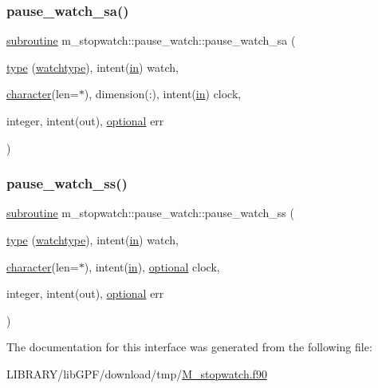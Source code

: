\subsubsection{\texorpdfstring{pause\+\_\+watch\+\_\+sa()}{pause\_watch\_sa()}}
{\footnotesize\ttfamily \hyperlink{M__stopwatch_83_8txt_acfbcff50169d691ff02d4a123ed70482}{subroutine} m\+\_\+stopwatch\+::pause\+\_\+watch\+::pause\+\_\+watch\+\_\+sa (\begin{DoxyParamCaption}\item[{\hyperlink{stop__watch_83_8txt_a70f0ead91c32e25323c03265aa302c1c}{type} (\hyperlink{structm__stopwatch_1_1watchtype}{watchtype}), intent(\hyperlink{M__journal_83_8txt_afce72651d1eed785a2132bee863b2f38}{in})}]{watch,  }\item[{\hyperlink{option__stopwatch_83_8txt_abd4b21fbbd175834027b5224bfe97e66}{character}(len=$\ast$), dimension(\+:), intent(\hyperlink{M__journal_83_8txt_afce72651d1eed785a2132bee863b2f38}{in})}]{clock,  }\item[{integer, intent(out), \hyperlink{option__stopwatch_83_8txt_aa4ece75e7acf58a4843f70fe18c3ade5}{optional}}]{err }\end{DoxyParamCaption})\hspace{0.3cm}{\ttfamily [private]}}

\mbox{\label{interfacem__stopwatch_1_1pause__watch_abc7e10bbde557d68d45fc4290cd798f7}} 
\subsubsection{\texorpdfstring{pause\+\_\+watch\+\_\+ss()}{pause\_watch\_ss()}}
{\footnotesize\ttfamily \hyperlink{M__stopwatch_83_8txt_acfbcff50169d691ff02d4a123ed70482}{subroutine} m\+\_\+stopwatch\+::pause\+\_\+watch\+::pause\+\_\+watch\+\_\+ss (\begin{DoxyParamCaption}\item[{\hyperlink{stop__watch_83_8txt_a70f0ead91c32e25323c03265aa302c1c}{type} (\hyperlink{structm__stopwatch_1_1watchtype}{watchtype}), intent(\hyperlink{M__journal_83_8txt_afce72651d1eed785a2132bee863b2f38}{in})}]{watch,  }\item[{\hyperlink{option__stopwatch_83_8txt_abd4b21fbbd175834027b5224bfe97e66}{character}(len=$\ast$), intent(\hyperlink{M__journal_83_8txt_afce72651d1eed785a2132bee863b2f38}{in}), \hyperlink{option__stopwatch_83_8txt_aa4ece75e7acf58a4843f70fe18c3ade5}{optional}}]{clock,  }\item[{integer, intent(out), \hyperlink{option__stopwatch_83_8txt_aa4ece75e7acf58a4843f70fe18c3ade5}{optional}}]{err }\end{DoxyParamCaption})\hspace{0.3cm}{\ttfamily [private]}}



The documentation for this interface was generated from the following file\+:\begin{DoxyCompactItemize}
\item 
L\+I\+B\+R\+A\+R\+Y/lib\+G\+P\+F/download/tmp/\hyperlink{M__stopwatch_8f90}{M\+\_\+stopwatch.\+f90}\end{DoxyCompactItemize}
